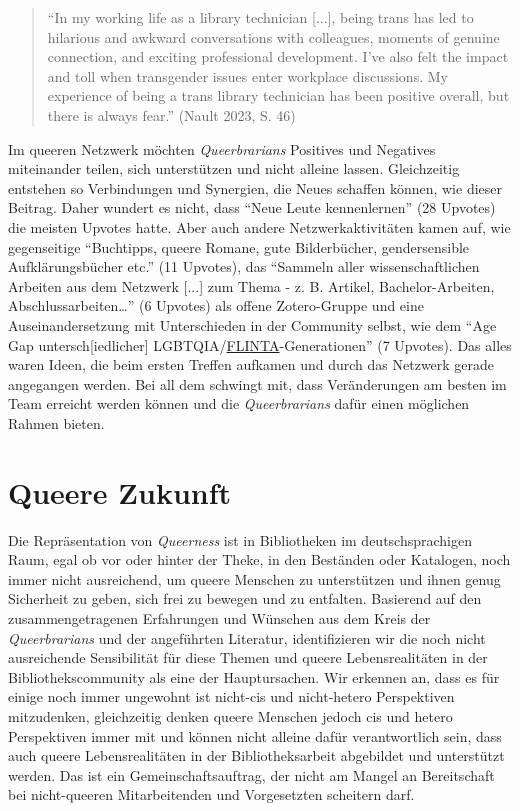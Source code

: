 \documentclass[a4paper,
fontsize=11pt,
oneside,
numbers=noperiodatend,
parskip=half-,
bibliography=totoc,
final
]{scrartcl}
\begin{document}
\begin{quote}
\enquote{In my working life as a library technician {[}...{]}, being
trans has led to hilarious and awkward conversations with colleagues,
moments of genuine connection, and exciting professional development.
I've also felt the impact and toll when transgender issues enter
workplace discussions. My experience of being a trans library technician
has been positive overall, but there is always fear.} (Nault 2023, S.
46)
\end{quote}

Im queeren Netzwerk möchten \emph{Queerbrarians} Positives und Negatives
miteinander teilen, sich unterstützen und nicht alleine lassen.
Gleichzeitig entstehen so Verbindungen und Synergien, die Neues schaffen
können, wie dieser Beitrag. Daher wundert es nicht, dass \enquote{Neue
Leute kennenlernen} (28 Upvotes) die meisten Upvotes hatte. Aber auch
andere Netzwerkaktivitäten kamen auf, wie gegenseitige
\enquote{Buchtipps, queere Romane, gute Bilderbücher, gendersensible
Aufklärungsbücher etc.} (11 Upvotes), das \enquote{Sammeln aller
wissenschaftlichen Arbeiten aus dem Netzwerk {[}...{]} zum Thema - z. B.
Artikel, Bachelor-Arbeiten, Abschlussarbeiten\ldots{}} (6 Upvotes) als
offene Zotero-Gruppe und eine Auseinandersetzung mit Unterschieden in
der Community selbst, wie dem \enquote{Age Gap untersch{[}iedlicher{]}
LGBTQIA/\href{https://queer-lexikon.net/2020/05/30/flint/}{FLINTA}-Generationen}
(7 Upvotes). Das alles waren Ideen, die beim ersten Treffen aufkamen und
durch das Netzwerk gerade angegangen werden. Bei all dem schwingt mit,
dass Veränderungen am besten im Team erreicht werden können und die
\emph{Queerbrarians} dafür einen möglichen Rahmen bieten.

\section{Queere Zukunft}\label{queere-zukunft}

Die Repräsentation von \emph{Queerness} ist in Bibliotheken im
deutschsprachigen Raum, egal ob vor oder hinter der Theke, in den
Beständen oder Katalogen, noch immer nicht ausreichend, um queere
Menschen zu unterstützen und ihnen genug Sicherheit zu geben, sich frei
zu bewegen und zu entfalten. Basierend auf den zusammengetragenen
Erfahrungen und Wünschen aus dem Kreis der \emph{Queerbrarians} und der
angeführten Literatur, identifizieren wir die noch nicht ausreichende
Sensibilität für diese Themen und queere Lebensrealitäten in der
Bibliothekscommunity als eine der Hauptursachen. Wir erkennen an, dass
es für einige noch immer ungewohnt ist nicht-cis und nicht-hetero
Perspektiven mitzudenken, gleichzeitig denken queere Menschen jedoch cis
und hetero Perspektiven immer mit und können nicht alleine dafür
verantwortlich sein, dass auch queere Lebensrealitäten in der
Bibliotheksarbeit abgebildet und unterstützt werden. Das ist ein
Gemeinschaftsauftrag, der nicht am Mangel an Bereitschaft bei
nicht-queeren Mitarbeitenden und Vorgesetzten scheitern darf.
\end{document}

